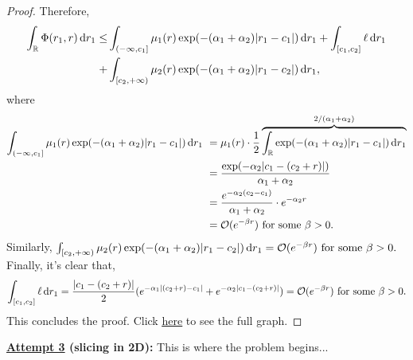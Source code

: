 \documentclass[12pt]{article}
\begin{document}
\begin{proof}
Therefore,
\begin{align*}
    \int_{\mathbb {R}} \Phi(r_1,r) \mathop{}\!\mathrm{d} r_1 \leq& \int_{(-\infty,c_1]} \mu_1(r) \exp(-(\alpha_1 + \alpha_2)|r_1 - c_1|) \mathop{}\!\mathrm{d} r_1
    + \int_{[c_1,c_2]} \ell \mathop{}\!\mathrm{d} r_1 \\
    +&\int_{[c_2,+\infty)} \mu_2(r) \exp(-(\alpha_1 + \alpha_2)|r_1 - c_2|) \mathop{}\!\mathrm{d} r_1,
\end{align*}
where
\begin{align*}
    \int_{(-\infty,c_1]} \mu_1(r) \exp(-(\alpha_1 + \alpha_2)|r_1 - c_1|) \mathop{}\!\mathrm{d} r_1 \
    &= \mu_1(r)\cdot \frac{1}{2} \overbrace{\int_{\mathbb {R}} \exp(-(\alpha_1 + \alpha_2)|r_1 - c_1|) \mathop{}\!\mathrm{d} r_1}^{2/(\alpha_1 + \alpha_2)}\\
    &= \frac{\exp(-\alpha_2|c_1 - (c_2 + r)|)}{\alpha_1 + \alpha_2}\\
    &= \frac{e^{-\alpha_2(c_2-c_1)}}{\alpha_1 + \alpha_2} \cdot e^{-\alpha_2 r}\\
    & = \mathcal{O}(e^{-\beta r}) \text{ for some } \beta > 0.
\end{align*}
Similarly, \(\int_{[c_2,+\infty)} \mu_2(r) \exp(-(\alpha_1 + \alpha_2)|r_1 - c_2|) \mathop{}\!\mathrm{d} r_1 = \mathcal{O}(e^{-\beta r}) \text{ for some } \beta > 0.\)
Finally, it's clear that,
\begin{align*}
    \int_{[c_1,c_2]} \ell \mathop{}\!\mathrm{d} r_1 = \frac{|c_1 - (c_2 + r)|}{2} (e^{-\alpha_1|(c_2 + r) - c_1|} + e^{-\alpha_2|c_1 - (c_2 + r)|}) = \mathcal{O}(e^{-\beta r}) \text{ for some } \beta > 0.
\end{align*}
This concludes the proof. Click \href{https://www.desmos.com/calculator/zuqivaujt4}{\underline{here}} to see the full graph.
\end{proof}

\textbf{\underline{Attempt 3} (slicing in 2D):} This is where the problem begins...
\end{document}

